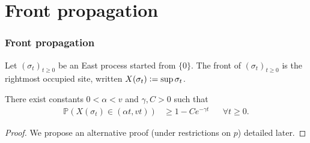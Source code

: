 \documentclass{beamer}
\renewcommand{\Pr}[1]{\mathbb{P} \left( #1 \right)}
\newcommand{\defeq}{\vcentcolon=}
\begin{document}
\section{Front propagation}
\begin{frame}
\frametitle{Front propagation}
\pause
\begin{definition}[Front]
Let $(\sigma_t)_{t \geq 0}$ be an East process started from $\{0\}$. The front of $(\sigma_t)_{t \geq 0}$  is the rightmost occupied site, written $X(\sigma_t) \defeq \sup\sigma_t$. 
\end{definition}
\pause
\begin{theorem}
There exist constants $0 < \alpha < v$ and $\gamma, C > 0$ such that
\begin{align*}
\Pr{X(\sigma_t) \in (\alpha t, v t)} &\geq 1 - C e^{- \gamma t} &&\forall t \geq 0.
\end{align*}
\end{theorem}
\pause
\begin{proof}
We propose an alternative proof (under restrictions on $p$) detailed later. 
\end{proof}
\end{frame}
\end{document}
